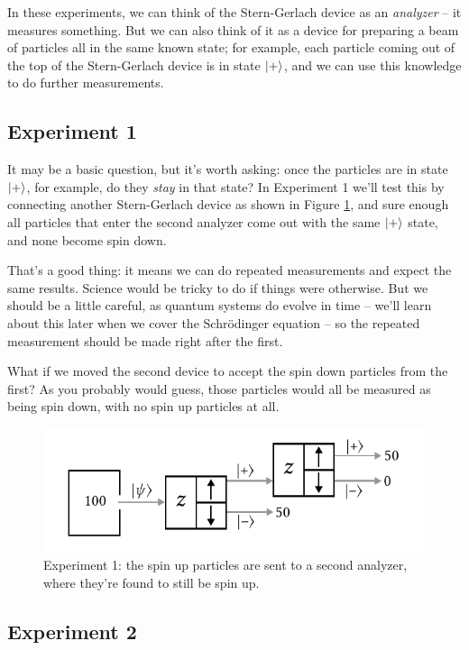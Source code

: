 In these experiments, we can think of the Stern-Gerlach device as an \emph{analyzer} -- it measures something.  But we can also think of it as a device for preparing a beam of particles all in the same known state; for example, each particle coming out of the top of the Stern-Gerlach device is in state $| + \rangle$, and we can use this knowledge to do further measurements. 

\subsection{Experiment 1}

It may be a basic question, but it's worth asking: once the particles are in state $| + \rangle$, for example, do they \emph{stay} in that state?  In Experiment 1 we'll test this by connecting another Stern-Gerlach device as shown in Figure \ref{fig_sg_1}, and sure enough all particles that enter the second analyzer come out with the same $| + \rangle$ state, and none become spin down.

That's a good thing: it means we can do repeated measurements and expect the same results.  Science would be tricky to do if things were otherwise.  But we should be a little careful, as quantum systems do evolve in time -- we'll learn about this later when we cover the Schr\"odinger equation -- so the repeated measurement should be made right after the first.

What if we moved the second device to accept the spin down particles from the first?  As you probably would guess, those particles would all be measured as being spin down, with no spin up particles at all.

\begin{figure}
\centering\includegraphics[width=0.8\linewidth]{Figures/Chapter 1/fig_sg_1.pdf}
\caption{Experiment 1: the spin up particles are sent to a second analyzer, where they're found to still be spin up. }
\label{fig_sg_1}
\end{figure}

\subsection{Experiment 2}

